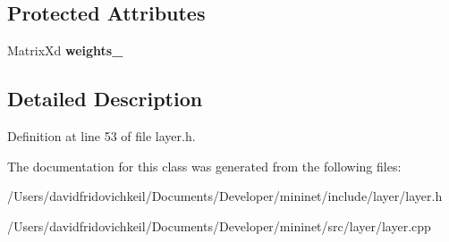 \subsection*{Protected Attributes}
\begin{DoxyCompactItemize}
\item 
\hypertarget{classmininet_1_1_layer_a9be2fab58f1a70c74b84c6fed4eac6c9}{}\label{classmininet_1_1_layer_a9be2fab58f1a70c74b84c6fed4eac6c9} 
Matrix\+Xd {\bfseries weights\+\_\+}
\end{DoxyCompactItemize}


\subsection{Detailed Description}


Definition at line 53 of file layer.\+h.



The documentation for this class was generated from the following files\+:\begin{DoxyCompactItemize}
\item 
/\+Users/davidfridovichkeil/\+Documents/\+Developer/mininet/include/layer/layer.\+h\item 
/\+Users/davidfridovichkeil/\+Documents/\+Developer/mininet/src/layer/layer.\+cpp\end{DoxyCompactItemize}
